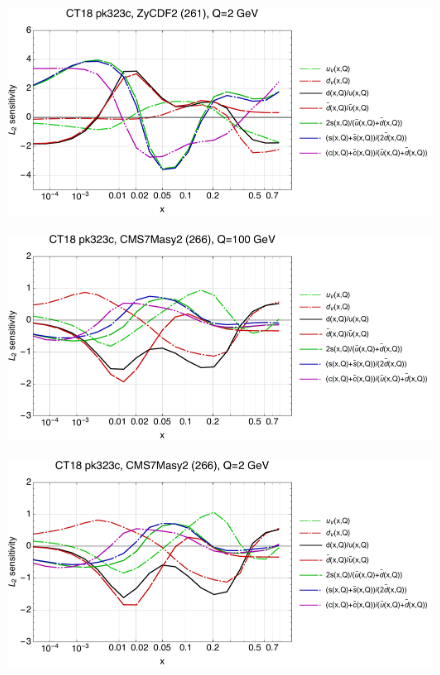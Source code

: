 \documentclass[10pt,aps,prd,floatfix,titlepage]{revtex4}
\begin{document}
\begin{figure}
\includegraphics[width=\textwidth,height=0.44\textheight,keepaspectratio]{2/261_ct18nn_q2_Sf_2.pdf}
\caption{}
\end{figure}
\clearpage
\begin{figure}
\includegraphics[width=\textwidth,height=0.44\textheight,keepaspectratio]{2/266_ct18nn_q100_Sf_2.pdf}
\caption{}
\end{figure}
\begin{figure}
\includegraphics[width=\textwidth,height=0.44\textheight,keepaspectratio]{2/266_ct18nn_q2_Sf_2.pdf}
\caption{}
\end{figure}
\end{document}
